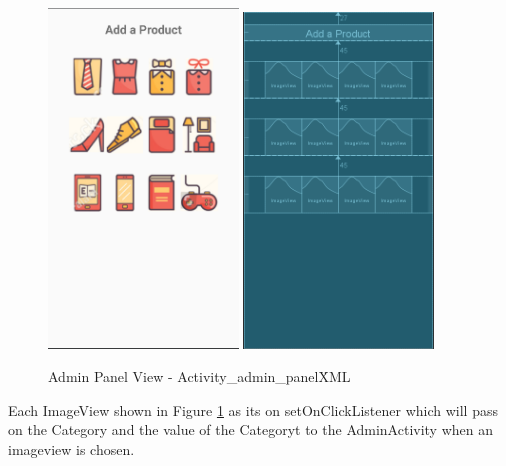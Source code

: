 \begin{figure}[h!]
	\caption{Admin Panel View - Activity\_admin\_panel\.XML}
	\label{image:myImageName}
	\centering
	\includegraphics[width=0.45\textwidth]{Images/admin_panel_view.png}
	\includegraphics[width=0.45\textwidth]{Images/admin_panel_design.png}
\end{figure}

Each ImageView shown in Figure \ref{image:myImageName} as its on setOnClickListener which will pass on the Category and the value of the Categoryt to the AdminActivity when an imageview is chosen.

